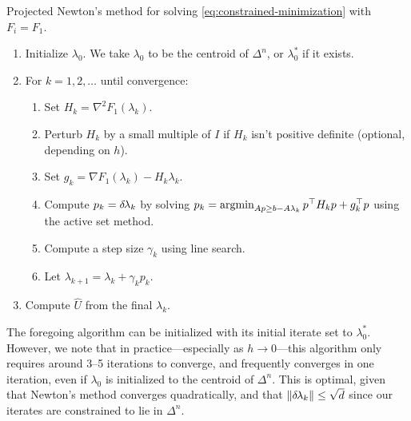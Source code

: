 \documentclass[eikonal.tex]{subfiles}
\begin{document}
\begin{algorithm}[H]
  \caption{Projected Newton's method for solving
    \cref{eq:constrained-minimization} with
    $F_i = F_1$.}\label{alg:proj-newton}
  \begin{enumerate}[nolistsep]
  \item Initialize $\lambda_0$. We take $\lambda_0$ to be the centroid
    of $\Delta^n$, or $\lambda_0^*$ if it exists.
  \item For $k = 1, 2, \hdots$ until convergence:
    \begin{enumerate}
    \item Set $H_k = \nabla^2 F_1(\lambda_k)$.
    \item Perturb $H_k$ by a small multiple of $I$ if $H_k$ isn't
      positive definite (optional, depending on $h$).
    \item Set $g_k = \nabla F_1(\lambda_k) - H_k \lambda_k$.
    \item Compute $p_k = {\delta \hspace{-0.1em} \lambda}_k$ by solving
      $p_k = \operatorname{argmin}_{Ap \geq b - A\lambda_k} p^\top H_k p + g_k^\top
      p$ using the active set method.
    \item Compute a step size $\gamma_k$ using line search.
    \item Let $\lambda_{k + 1} = \lambda_k + \gamma_k p_k$.
    \end{enumerate}
  \item Compute $\hat{U}$ from the final $\lambda_k$.
  \end{enumerate}
\end{algorithm}

The foregoing algorithm can be initialized with its initial iterate
set to $\lambda_0^*$. However, we note that in practice---especially
as $h \to 0$---this algorithm only requires around 3--5 iterations to
converge, and frequently converges in one iteration, even if
$\lambda_0$ is initialized to the centroid of $\Delta^n$. This is
optimal, given that Newton's method converges quadratically, and that
$\left\|{\delta \hspace{-0.1em} \lambda}_k\right\| \leq \sqrt{d}$ since our iterates are
constrained to lie in $\Delta^n$.
\end{document}

